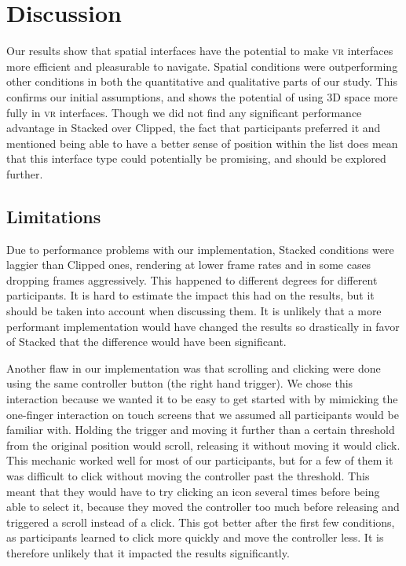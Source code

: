 \documentclass[nobib]{tufte-book} %
\begin{document}
\chapter{Discussion}
\label{ch:discussion}

Our results show that spatial interfaces have the potential to make \textsc{vr} interfaces more efficient and pleasurable to navigate. Spatial conditions were outperforming other conditions in both the quantitative and qualitative parts of our study. This confirms our initial assumptions, and shows the potential of using 3D space more fully in \textsc{vr} interfaces. Though we did not find any significant performance advantage in Stacked over Clipped, the fact that participants preferred it and mentioned being able to have a better sense of position within the list does mean that this interface type could potentially be promising, and should be explored further.

\section{Limitations}
Due to performance problems with our implementation, Stacked conditions were laggier than Clipped ones, rendering at lower frame rates and in some cases dropping frames aggressively. This happened to different degrees for different participants. It is hard to estimate the impact this had on the results, but it should be taken into account when discussing them. It is unlikely that a more performant implementation would have changed the results so drastically in favor of Stacked that the difference would have been significant.

Another flaw in our implementation was that scrolling and clicking were done using the same controller button (the right hand trigger). We chose this interaction because we wanted it to be easy to get started with by mimicking the one-finger interaction on touch screens that we assumed all participants would be familiar with. Holding the trigger and moving it further than a certain threshold from the original position would scroll, releasing it without moving it would click. This mechanic worked well for most of our participants, but for a few of them it was difficult to click without moving the controller past the threshold. This meant that they would have to try clicking an icon several times before being able to select it, because they moved the controller too much before releasing and triggered a scroll instead of a click. This got better after the first few conditions, as participants learned to click more quickly and move the controller less. It is therefore unlikely that it impacted the results significantly.
\end{document}
